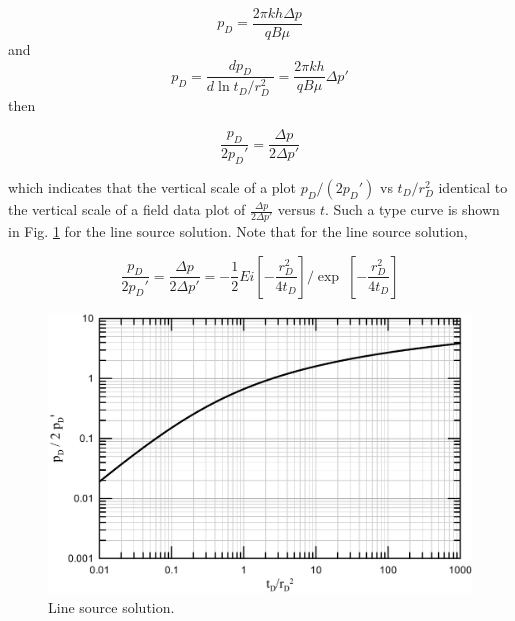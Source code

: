 \documentclass{llncs}
\numberwithin{equation}{section}
\numberwithin{figure}{section}
\numberwithin{table}{section}
\begin{document}
    \begin{equation*}
        {{p}_{D}}=\frac{2\pi kh\Delta p}{qB\mu }
    \end{equation*}
    and
    \begin{equation*}
    {{p}_{D}}=\frac{d{{p}_{D}}}{d\ln {{{t}_{D}}}/{r_{D}^{2}}\;}=\frac{2\pi kh}{qB\mu }\Delta p'
    \end{equation*}
    then

    \begin{equation}
        \frac{{{p}_{D}}}{2{{p}_{D}}'}=\frac{\Delta p}{2\Delta p'}
        \label{Rpp_prime_2}
    \end{equation}

    which indicates that the vertical scale of a plot ${{{p}_{D}}}/{\left( 2{{p}_{D}}' \right)}$ vs ${{{t}_{D}}}/{r_{D}^{2}}$  identical to the vertical scale of a field data plot of $\frac{\Delta p}{2\Delta p'}$ versus $t$. Such a type curve is shown in Fig. \ref{Rpp} for the line source solution. Note that for the line source solution,

    \begin{equation}
    \frac{{{p}_{D}}}{2{{p}_{D}}'}=\frac{\Delta p}{2\Delta p'}=-\frac{1}{2}{Ei\left[ -\frac{r_{D}^{2}}{4{{t}_{D}}} \right]}/{\exp }\;\left[ -\frac{r_{D}^{2}}{4{{t}_{D}}} \right]
        \label{Rpp_prime_3}
    \end{equation}

    \begin{figure}
        \begin{center}
        \includegraphics[scale=0.6]{Rpp.pdf}
        \end{center}
        \caption{Line source solution.}
        \label{Rpp}
    \end{figure}
\end{document}
